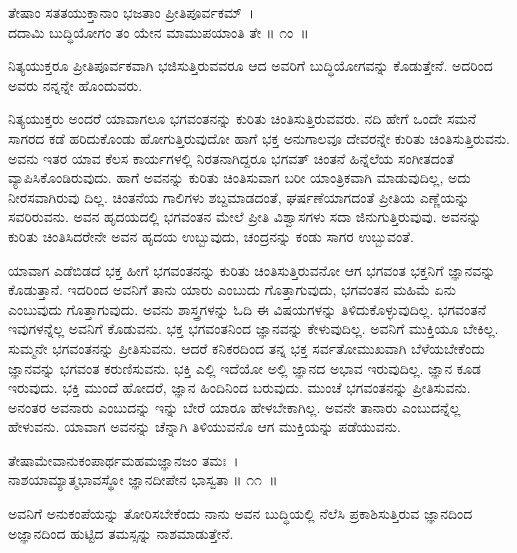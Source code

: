 \begin{shloka}
ತೇಷಾಂ ಸತತಯುಕ್ತಾನಾಂ ಭಜತಾಂ ಪ್ರೀತಿಪೂರ್ವಕಮ್~।\\ದದಾಮಿ ಬುದ್ಧಿಯೋಗಂ ತಂ ಯೇನ ಮಾಮುಪಯಾಂತಿ ತೇ \hfill॥ ೧ಂ~॥
\end{shloka}

\begin{artha}
ನಿತ್ಯಯುಕ್ತರೂ ಪ್ರೀತಿಪೂರ್ವಕವಾಗಿ ಭಜಿಸುತ್ತಿರುವವರೂ ಆದ ಅವರಿಗೆ ಬುದ್ಧಿಯೋಗವನ್ನು ಕೊಡುತ್ತೇನೆ. ಅದರಿಂದ ಅವರು ನನ್ನನ್ನೇ ಹೊಂದುವರು.
\end{artha}

ನಿತ್ಯಯುಕ್ತರು ಅಂದರೆ ಯಾವಾಗಲೂ ಭಗವಂತನನ್ನು ಕುರಿತು ಚಿಂತಿಸುತ್ತಿರುವವರು. ನದಿ ಹೇಗೆ ಒಂದೇ ಸಮನೆ ಸಾಗರದ ಕಡೆ ಹರಿದುಕೊಂಡು ಹೋಗುತ್ತಿರುವುದೋ ಹಾಗೆ ಭಕ್ತ ಅನು\-ಗಾಲವೂ ದೇವರನ್ನೇ ಕುರಿತು ಚಿಂತಿಸುತ್ತಿರುವನು. ಅವನು ಇತರ ಯಾವ ಕೆಲಸ ಕಾರ್ಯಗಳಲ್ಲಿ ನಿರತನಾಗಿದ್ದರೂ ಭಗವತ್ ಚಿಂತನೆ ಹಿನ್ನೆಲೆಯ ಸಂಗೀತದಂತೆ ವ್ಯಾಪಿಸಿಕೊಂಡಿರುವುದು. ಹಾಗೆ ಅವನನ್ನು ಕುರಿತು ಚಿಂತಿಸುವಾಗ ಬರೀ ಯಾಂತ್ರಿಕವಾಗಿ ಮಾಡುವುದಿಲ್ಲ, ಅದು ನೀರಸವಾಗಿರುವು ದಿಲ್ಲ. ಚಿಂತನೆಯ ಗಾಲಿಗಳು ಶಬ್ದಮಾಡದಂತೆ, ಘರ್ಷಣೆಯಾಗದಂತೆ ಪ್ರೀತಿಯ ಎಣ್ಣೆಯನ್ನು ಸವರಿರುವನು. ಅವನ ಹೃದಯದಲ್ಲಿ ಭಗವಂತನ ಮೇಲೆ ಪ್ರೀತಿ ವಿಶ್ವಾಸಗಳು ಸದಾ ಜಿನುಗು\-ತ್ತಿರುವುವು. ಅವನನ್ನು ಕುರಿತು ಚಿಂತಿಸಿದರೇನೇ ಅವನ ಹೃದಯ ಉಬ್ಬುವುದು, ಚಂದ್ರನನ್ನು ಕಂಡು ಸಾಗರ ಉಬ್ಬುವಂತೆ.

ಯಾವಾಗ ಎಡೆಬಿಡದೆ ಭಕ್ತ ಹೀಗೆ ಭಗವಂತನನ್ನು ಕುರಿತು ಚಿಂತಿಸುತ್ತಿರುವನೋ ಆಗ ಭಗವಂತ ಭಕ್ತನಿಗೆ ಜ್ಞಾನವನ್ನು ಕೊಡುತ್ತಾನೆ. ಇದರಿಂದ ಅವನಿಗೆ ತಾನು ಯಾರು ಎಂಬುದು ಗೊತ್ತಾಗುವುದು, ಭಗವಂತನ ಮಹಿಮೆ ಏನು ಎಂಬುವುದು ಗೊತ್ತಾಗುವುದು. ಅವನು ಶಾಸ್ತ್ರಗಳನ್ನು ಓದಿ ಈ ವಿಷಯಗಳನ್ನು ತಿಳಿದುಕೊಳ್ಳುವುದಿಲ್ಲ. ಭಗವಂತನೆ ಇವುಗಳನ್ನೆಲ್ಲ ಅವನಿಗೆ ಕೊಡುವನು. ಭಕ್ತ ಭಗವಂತನಿಂದ ಜ್ಞಾನವನ್ನು ಕೇಳುವುದಿಲ್ಲ. ಅವನಿಗೆ ಮುಕ್ತಿಯೂ ಬೇಕಿಲ್ಲ. ಸುಮ್ಮನೇ ಭಗವಂತನನ್ನು ಪ್ರೀತಿಸುವನು. ಆದರೆ ಕನಿಕರದಿಂದ ತನ್ನ ಭಕ್ತ ಸರ್ವತೋಮುಖವಾಗಿ ಬೆಳೆಯಬೇಕೆಂದು ಜ್ಞಾನವನ್ನು ಭಗವಂತ ಕರುಣಿಸುವನು. ಭಕ್ತಿ ಎಲ್ಲಿ ಇದೆಯೋ ಅಲ್ಲಿ ಜ್ಞಾನದ ಅಭಾವ ಇರುವುದಿಲ್ಲ. ಜ್ಞಾನ ಕೂಡ ಇರುವುದು. ಭಕ್ತಿ ಮುಂದೆ ಹೋದರೆ, ಜ್ಞಾನ ಹಿಂದಿನಿಂದ ಬರುವುದು. ಮುಂಚೆ ಭಗವಂತನನ್ನು ಪ್ರೀತಿಸುವನು. ಅನಂತರ ಅವನಾರು ಎಂಬುದನ್ನು ಇನ್ನು ಬೇರೆ ಯಾರೂ ಹೇಳಬೇಕಾಗಿಲ್ಲ. ಅವನೇ ತಾನಾರು ಎಂಬುದನ್ನೆಲ್ಲ ಹೇಳುವನು. ಯಾವಾಗ ಅವನನ್ನು ಚೆನ್ನಾಗಿ ತಿಳಿಯುವನೊ ಆಗ ಮುಕ್ತಿಯನ್ನು ಪಡೆಯುವನು.

\begin{shloka}
ತೇಷಾಮೇವಾನುಕಂಪಾರ್ಥಮಹಮಜ್ಞಾನಜಂ ತಮಃ~।\\ನಾಶಯಾಮ್ಯಾತ್ಮಭಾವಸ್ಥೋ ಜ್ಞಾನದೀಪೇನ ಭಾಸ್ವತಾ \hfill॥ ೧೧~॥
\end{shloka}

\begin{artha}
ಅವನಿಗೆ ಅನುಕಂಪೆಯನ್ನು ತೋರಿಸಬೇಕೆಂದು ನಾನು ಅವನ ಬುದ್ಧಿಯಲ್ಲಿ ನೆಲೆಸಿ ಪ್ರಕಾಶಿಸುತ್ತಿರುವ ಜ್ಞಾನದಿಂದ ಅಜ್ಞಾನದಿಂದ ಹುಟ್ಟಿದ ತಮಸ್ಸನ್ನು ನಾಶಮಾಡುತ್ತೇನೆ.
\end{artha}

